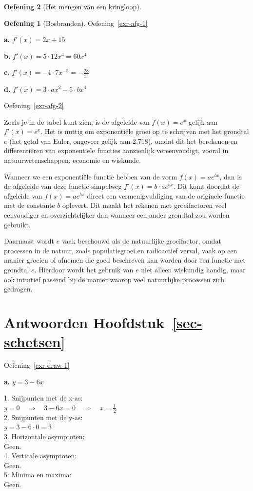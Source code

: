 \documentclass[
  a4paper,
]{scrbook}
\theoremstyle{definition}
\newtheorem{exercise}{Oefening}[chapter]
\theoremstyle{remark}
\begin{document}
\begin{exercise}[Het mengen van een
kringloop]
\begin{exercise}[Bosbranden]

Oefening~\ref{exr-afg-1}

\textbf{a.} \(f'(x)=2x+15\)

\textbf{b.} \(f'(x)=5\cdot12x^4=60x^4\)

\textbf{c.} \(f'(x)=-4\cdot7x^{-5}=-\frac{28}{x^5}\)

\textbf{d.} \(f'(x)=3\cdot ax^2-5\cdot bx^4\)

Oefening~\ref{exr-afg-2}

Zoals je in de tabel kunt zien, is de afgeleide van \(f(x)=e^x\) gelijk
aan \(f'(x)=e^x\). Het is nuttig om exponentiële groei op te schrijven
met het grondtal \(e\) (het getal van Euler, ongeveer gelijk aan 2,718),
omdat dit het berekenen en differentiëren van exponentiële functies
aanzienlijk vereenvoudigt, vooral in natuurwetenschappen, economie en
wiskunde.

Wanneer we een exponentiële functie hebben van de vorm \(f(x)=ae^{bx}\),
dan is de afgeleide van deze functie simpelweg
\(f'(x)=b \cdot ae^{bx}\). Dit komt doordat de afgeleide van
\(f(x)=ae^{bx}\) direct een vermenigvuldiging van de originele functie
met de constante \(b\) oplevert. Dit maakt het rekenen met groeifactoren
veel eenvoudiger en overzichtelijker dan wanneer een ander grondtal zou
worden gebruikt.

Daarnaast wordt \(e\) vaak beschouwd als de natuurlijke groeifactor,
omdat processen in de natuur, zoals populatiegroei en radioactief
verval, vaak op een manier groeien of afnemen die goed beschreven kan
worden door een functie met grondtal \(e\). Hierdoor wordt het gebruik
van \(e\) niet alleen wiskundig handig, maar ook intuïtief passend bij
de manier waarop veel natuurlijke processen zich gedragen.

\section*{\texorpdfstring{Antwoorden
Hoofdstuk~\ref{sec-schetsen}}{Antwoorden Hoofdstuk~}}\label{antwoorden-sec-schetsen}


Oefening~\ref{exr-draw-1}

\textbf{a.} \(y=3-6x\)

1. Snijpunten met de x-as:\\
\(y = 0 \quad \Rightarrow \quad 3 - 6x = 0 \quad \Rightarrow \quad x = \frac{1}{2}\)\\
2. Snijpunten met de y-as:\\
\(y = 3 - 6 \cdot 0 = 3\)\\
3. Horizontale asymptoten:\\
Geen.\\
4. Verticale asymptoten:\\
Geen.\\
5: Minima en maxima:\\
Geen.


\end{exercise}
\end{exercise}
\end{document}
